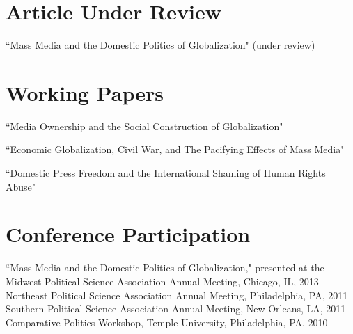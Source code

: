 \documentclass[margin, 12pt]{res} %
\begin{document}
\begin{resume}
\section{Article Under Review} 

``Mass Media and the Domestic Politics of Globalization" (under review)


\section{Working Papers} 

``Media Ownership and the Social Construction of Globalization"

``Economic Globalization, Civil War, and The Pacifying Effects of Mass Media" 

``Domestic Press Freedom and the International Shaming of Human Rights Abuse"


\section{Conference Participation} 

``Mass Media and the Domestic Politics of Globalization," presented at the Midwest Political Science Association Annual Meeting, Chicago, IL, 2013 \vspace{3 mm} \\
Northeast Political Science Association Annual Meeting, Philadelphia, PA,  2011  \vspace{3 mm} \\ 
Southern Political Science Association Annual Meeting, New Orleans, LA, 2011 \vspace{3 mm} \\
Comparative Politics Workshop, Temple University, Philadelphia, PA, 2010 \\



\end{resume}
\end{document}
